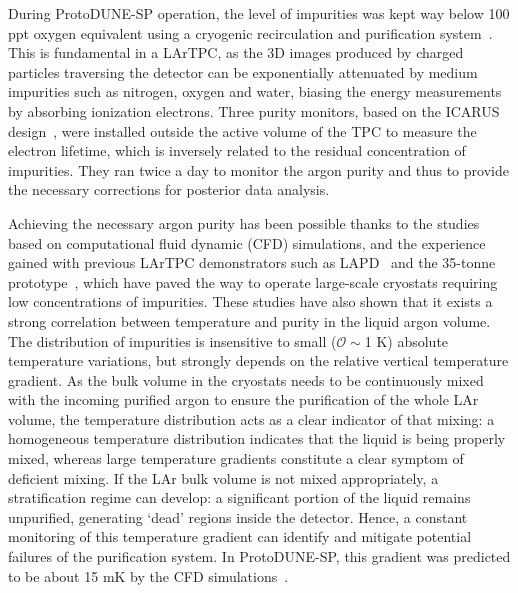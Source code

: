 
During ProtoDUNE-SP operation, the level of impurities was kept way below 100 ppt oxygen equivalent using a cryogenic recirculation and purification system~\cite{pdsp_tdr,pdsp_2}. This is fundamental in a LArTPC, as the 3D images produced by charged particles traversing the detector can be exponentially attenuated by medium impurities such as nitrogen, oxygen and water, biasing the energy measurements by absorbing ionization electrons. Three purity monitors, based on the ICARUS design~\cite{PrMs}, were installed outside the active volume of the TPC to measure the electron lifetime, which is inversely related to the residual concentration of impurities. They ran twice a day to monitor the argon purity and thus to provide the necessary corrections for posterior data analysis. 

Achieving the necessary argon purity has been possible thanks to the studies based on computational fluid dynamic (CFD) simulations, and the experience gained with previous LArTPC demonstrators such as LAPD~\cite{lapd} and the 35-tonne prototype~\cite{35t_1,35t_2}, which have paved the way to operate large-scale cryostats requiring low concentrations of impurities. These studies have also shown that it exists a strong correlation between temperature and purity in the liquid argon volume. The distribution of impurities is insensitive to small ($\mathcal{O}\sim$1 K) absolute temperature variations, but strongly depends on the relative vertical temperature gradient. As the bulk volume in the cryostats needs to be continuously mixed with the incoming purified argon to ensure the purification of the whole LAr volume, the temperature distribution acts as a clear indicator of that mixing: a homogeneous temperature distribution indicates that the liquid is being properly mixed, whereas large temperature gradients constitute a clear symptom of deficient mixing. If the LAr bulk volume is not mixed appropriately, a stratification regime can develop: a significant portion of the liquid remains unpurified, generating `dead' regions inside the detector. Hence, a constant monitoring of this temperature gradient can identify and mitigate potential failures of the purification system. In ProtoDUNE-SP, this gradient was predicted to be about 15 mK by the CFD simulations~\cite{pdsp_tdr,dune_tdr4}. 

